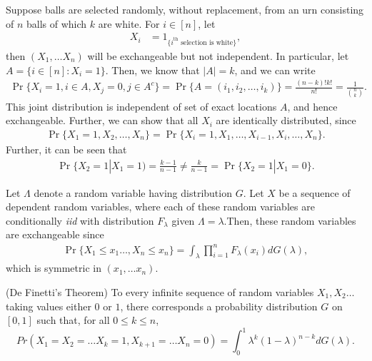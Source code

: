 \documentclass[a4paper,10pt,english]{article}
\begin{document}
\begin{exmp}
Suppose balls are selected randomly, without replacement, from an urn consisting of $n$ balls of which $k$ are white. For $i \in [n]$, let
\begin{align*}
   X_i &= 1_{\{ i^{\text{th}}\text{ selection is white}\}},
\end{align*}
then $(X_1, \ldots X_n)$ will be exchangeable but not independent.  
In particular, let $A = \{ i \in [n]: X_i = 1\}$. Then, we know that $|A| = k$, and we can write 
\begin{align*}
\Pr\{X_i = 1, i \in A, X_j = 0, j \in A^c\} = \Pr\{A = (i_1, i_2, \ldots, i_k) \} = \frac{(n-k)!k!}{n!} = \frac{1}{\binom{n}{k}}.
\end{align*}
This joint distribution is independent of set of exact locations $A$, and hence exchangeable. 
Further, we can show that all $X_i$ are identically distributed, since
\begin{align*}
\Pr\{X_1= 1, X_2, \ldots, X_n\} = \Pr\{X_i = 1, X_1, \ldots, X_{i-1}, X_i, \ldots, X_n\}. 
\end{align*}
Further, it can be seen that
\begin{align*}
\Pr\{X_2 = 1|X_1= 1) = \frac{k-1}{n-1} \neq \frac{k}{n-1} = \Pr\{X_2 = 1|X_1 =0\}.
\end{align*}
\end{exmp}
\begin{exmp}
Let $\Lambda$ denote a random variable having distribution $G$. Let $X$ be a sequence of dependent random variables, where each of these random variables are conditionally \textit{iid} with distribution $F_\lambda$ given $\Lambda= \lambda$.Then, these random variables are exchangeable since
\begin{align*}
\Pr\{X_1 \leq x_1 \ldots , X_n \leq x_n\} = \int_{\lambda} \prod_{i=1}^nF_\lambda(x_i)dG(\lambda),
\end{align*}
which is symmetric in $(x_1, \ldots x_n)$. %
\end{exmp}
\begin{thm}
(De Finetti's Theorem) To every infinite sequence of random variables $X_1, X_2 \hdots $ taking values either $0$ or $1$, there corresponds a probability distribution $G$ on $[0,1]$ such that, for all $0 \leq k \leq n$,
\begin{equation*}
\label{De Finetti}
Pr(X_1=X_2= \hdots X_k =1, X_{k+1}= \hdots X_n = 0)= \int_{0}^{1}\lambda^k(1-\lambda)^{n-k}dG(\lambda).
\end{equation*}  
\end{thm}
\end{document}
